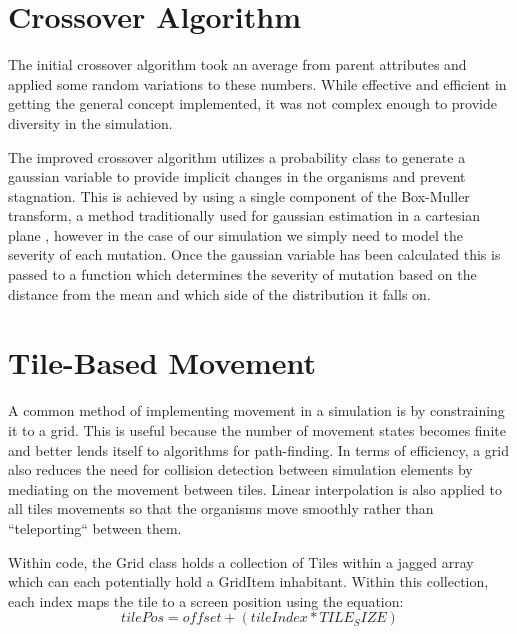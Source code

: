 \documentclass[a4paper, oneside, 11pt]{report}
\begin{document}
\section{Crossover Algorithm}\label{crossover}
The initial crossover algorithm took an average from parent attributes and applied some random variations to these numbers. While effective and efficient in getting the general concept implemented, it was not complex enough to provide diversity in the simulation.

The improved crossover algorithm utilizes a probability class to generate a gaussian variable to provide implicit changes in the organisms and prevent stagnation. This is achieved by using a single component of the Box-Muller transform, a method traditionally used for gaussian estimation in a cartesian plane \cite{box1958note}, however in the case of our simulation we simply need to model the severity of each mutation. Once the gaussian variable has been calculated this is passed to a function which determines the severity of mutation based on the distance from the mean and which side of the distribution it falls on.

\section{Tile-Based Movement}\label{grid}
A common method of implementing movement in a simulation is by constraining it to a grid. This is useful because the number of movement states becomes finite and better lends itself to algorithms for path-finding. In terms of efficiency, a grid also reduces the need for collision detection between simulation elements by mediating on the movement between tiles. Linear interpolation is also applied to all tiles movements so that the organisms move smoothly rather than ``teleporting`` between them.

Within code, the Grid class holds a collection of Tiles within a jagged array which can each potentially hold a GridItem inhabitant. Within this collection, each index maps the tile to a screen position using the equation:
\[tilePos = offset + (tileIndex * TILE_SIZE)\]
\end{document}
